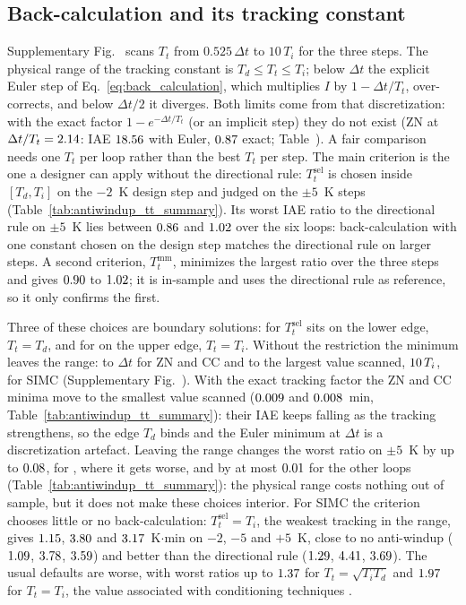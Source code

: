 \subsection{Back-calculation and its tracking constant}
\label{subsec:backcalc}
Supplementary Fig.~ scans $T_t$ from $0.525\,\Delta t$ to $10\,T_i$ for the three steps. The physical range of the tracking constant is $T_d \le T_t \le T_i$; below $\Delta t$ the explicit Euler step of Eq.~\eqref{eq:back_calculation}, which multiplies $I$ by $1 - \Delta t/T_t$, over-corrects, and below $\Delta t/2$ it diverges. Both limits come from that discretization: with the exact factor $1 - e^{-\Delta t/T_t}$ (or an implicit step) they do not exist (ZN at $\Delta t/T_t = 2.14$: IAE $18.56$ with Euler, $0.87$ exact; Table~). A fair comparison needs one $T_t$ per loop rather than the best $T_t$ per step. The main criterion is the one a designer can apply without the directional rule: $T_t^{\mathrm{sel}}$ is chosen inside $[T_d, T_i]$ on the $-2$~K design step and judged on the $\pm 5$~K steps (Table~\ref{tab:antiwindup_tt_summary}). Its worst IAE ratio to the directional rule on $\pm 5$~K lies between $0.86$ and $1.02$ over the six loops: back-calculation with one constant chosen on the design step matches the directional rule on larger steps. A second criterion, $T_t^{\mathrm{mm}}$, minimizes the largest ratio over the three steps and gives $0.90$ to $1.02$; it is in-sample and uses the directional rule as reference, so it only confirms the first.

Three of these choices are boundary solutions: for \vttcvlower{} $T_t^{\mathrm{sel}}$ sits on the lower edge, $T_t = T_d$, and for \vttcvupper{} on the upper edge, $T_t = T_i$. Without the restriction the minimum leaves the range: to $\Delta t$ for ZN and CC and to the largest value scanned, $10\,T_i$, for SIMC (Supplementary Fig.~). With the exact tracking factor the ZN and CC minima move to the smallest value scanned ($0.009$ and $0.008$~min, Table~\ref{tab:antiwindup_tt_summary}): their IAE keeps falling as the tracking strengthens, so the edge $T_d$ binds and the Euler minimum at $\Delta t$ is a discretization artefact. Leaving the range changes the worst ratio on $\pm 5$~K by up to $0.08$, for \vttfreediffloop{}, where it gets worse, and by at most $0.01$ for the other loops (Table~\ref{tab:antiwindup_tt_summary}): the physical range costs nothing out of sample, but it does not make these choices interior. For SIMC the criterion chooses little or no back-calculation: $T_t^{\mathrm{sel}} = T_i$, the weakest tracking in the range, gives $1.15$, $3.80$ and $3.17$~K$\cdot$min on $-2$, $-5$ and $+5$~K, close to no anti-windup ($1.09$, $3.78$, $3.59$) and better than the directional rule ($1.29$, $4.41$, $3.69$). The usual defaults are worse, with worst ratios up to $1.37$ for $T_t = \sqrt{T_iT_d}$ and $1.97$ for $T_t = T_i$, the value associated with conditioning techniques \cite{peng1996nonlinear}.

